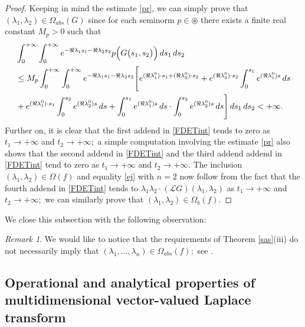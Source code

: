 \documentclass{amsart}
\theoremstyle{definition}
\theoremstyle{remark}
\newtheorem{rem}[thm]{Remark}
\numberwithin{equation}{section}
\begin{document}
\begin{proof}
Keeping in mind the estimate \eqref{pr}, we can simply prove that $(\lambda_{1},\lambda_{2})\in \Omega_{abs}(G)$ since for each seminorm $p\in \circledast$ there exists a finite real constant $M_{p}>0$ such that
\begin{align*} &
 \int^{+\infty}_{0}\int^{+\infty}_{0}e^{-\Re \lambda_{1}s_{1}-\Re \lambda_{2}s_{2}}p\Bigl(G\bigl( s_{1},s_{2}\bigr)\Bigr)\, ds_{1}\, ds_{2}
\\& \leq M_{p} \int^{+\infty}_{0}\int^{+\infty}_{0}e^{-\Re \lambda_{1}s_{1}-\Re \lambda_{2}s_{2}}\Biggl[ e^{(\Re \lambda_{1}^{0})\cdot s_{1}+(\Re \lambda_{2}^{0})\cdot s_{2}}+e^{(\Re \lambda_{2}^{0})\cdot s_{2}} \int^{s_{1}}_{0}e^{(\Re \lambda_{1}^{0})s}\, ds\\&+e^{(\Re \lambda_{1}^{0})\cdot s_{1}} \int^{s_{2}}_{0}e^{(\Re \lambda_{2}^{0})s}\, ds+\int^{s_{1}}_{0}e^{(\Re \lambda_{1}^{0})s}\, ds \cdot  \int^{s_{2}}_{0}e^{(\Re \lambda_{2}^{0})s}\, ds\Biggr]\, ds_{1}\, ds_{2}<+\infty.
\end{align*}
Further on, it is clear that the first addend in \eqref{FDETint} tends to zero as $t_{1}\rightarrow +\infty$ and $t_{2}\rightarrow +\infty;$ a simple computation involving the estimate \eqref{pr} also shows that the second addend in \eqref{FDETint} and the third addend addend in \eqref{FDETint} tend to zero as $t_{1}\rightarrow +\infty$ and $t_{2}\rightarrow +\infty.$ The inclusion $(\lambda_{1},\lambda_{2})\in \Omega(f)$ and equality \eqref{ej} with $n=2$ now follow from the fact that the fourth addend in \eqref{FDETint} tends to $\lambda_{1}\lambda_{2}\cdot ( {\mathcal L} G) (\lambda_{1},\lambda_{2})$ as $t_{1}\rightarrow +\infty$ and $t_{2}\rightarrow +\infty;$ we can similarly prove that $(\lambda_{1},\lambda_{2})\in \Omega_{b}(f)$.
\end{proof}  

We close this subsection with the following observation:

\begin{rem}\label{out}
We would like to notice that the requirements of Theorem \ref{sas}(iii) do not necessarily imply that $(\lambda_{1},...,\lambda_{n})\in \Omega_{abs}(f) ;$ see \cite[Example 1.4.4]{a43}. 
\end{rem}

\subsection{Operational and analytical properties of multidimensional vector-valued Laplace transform}\label{regions1}
\end{document}
